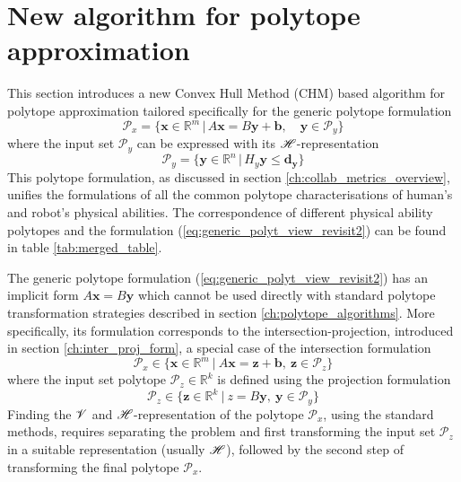\section{New algorithm for polytope approximation}
\label{ch:algorihtm_ichm}

This section introduces a new Convex Hull Method (CHM) based algorithm for polytope approximation tailored specifically for the generic polytope formulation
\begin{equation}
    \mathcal{P}_x = \big\{ \bm{x}\in \mathbb{R}^{m}\, |\,A\bm{x} = B\bm{y} + \bm{b}, \quad  \bm{y}\in\mathcal{P}_y  \big\}
    \label{eq:generic_polyt_view_revisit2}
\end{equation}
where the input set $\mathcal{P}_y$ can be expressed with its $\mathscr{H}$-representation
\begin{equation}
    \mathcal{P}_y = \big\{ \bm{y}\in \mathbb{R}^{n}\, |\,H_y\bm{y} \leq \bm{d_y}\big\}
    \label{eq:generic_poly_input_set_revisit2}
\end{equation} 
This polytope formulation, as discussed in section \ref{ch:collab_metrics_overview}, unifies the formulations of all the common polytope characterisations of human's and robot's physical abilities. The correspondence of different physical ability polytopes and the formulation (\ref{eq:generic_polyt_view_revisit2}) can be found in table \ref{tab:merged_table}. 

The generic polytope formulation (\ref{eq:generic_polyt_view_revisit2}) has an implicit form $A\bm{x}=B\bm{y}$ which cannot be used directly with standard polytope transformation strategies described in section \ref{ch:polytope_algorithms}. More specifically, its formulation corresponds to the intersection-projection, introduced in section \ref{ch:inter_proj_form}, a special case of the intersection formulation 
\begin{equation}
    \mathcal{P}_x \in \{\bm{x}\in \mathbb{R}^m~|~A \bm{x} = \bm{z} + \bm{b},~ \bm{z} \in \mathcal{P}_z\} 
\end{equation}
where the input set polytope $\mathcal{P}_z\in\mathbb{R}^k$ is defined using the projection formulation
\begin{equation}
    \mathcal{P}_z \in \{\bm{z}\in \mathbb{R}^k~|~z = B\bm{y},~ \bm{y} \in \mathcal{P}_y\} 
\end{equation}
Finding the $\mathscr{V}$ and $\mathscr{H}$-representation of the polytope $\mathcal{P}_x$, using the standard methods, requires separating the problem and first transforming the input set $\mathcal{P}_z$ in a suitable representation (usually $\mathscr{H}$), followed by the second step of transforming the final polytope $\mathcal{P}_x$. 

